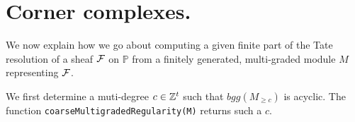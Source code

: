 \documentclass[twoside,12pt, leqno]{amsart}
\def\PP{{\mathbb P}}
\def\P{{\mathbb P}}
\begin{document}
%
%
%

\section{Corner complexes.}\label{sec:cornercomplex}

We now explain how we go about computing a given finite part of the Tate resolution
of a sheaf ${\mathcal F}$ on $\PP$ from a finitely generated, multi-graded module $M$
representing ${\mathcal F}$.

We first determine a muti-degree $c \in {\mathbb Z}^t$ such that $bgg(M_{ \ge c})$ is acyclic.
The function {\tt coarseMultigradedRegularity(M)} returns such a $c$.
\end{document}
